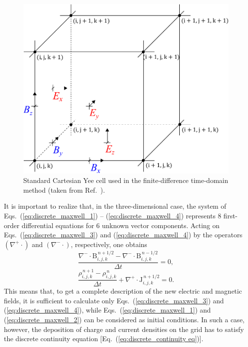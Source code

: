 \documentclass[10pt, a4paper, twoside, openright]{report}
\renewcommand{\vec}[1]{\boldsymbol{\mathrm{#1}}}
\begin{document}
\begin{figure}[t]
	\includegraphics[width=0.35\paperwidth]{./img/yee.pdf}
	\caption[]{\label{fig:yee_lattice} Standard Cartesian Yee cell used in the finite-difference time-domain method (taken from Ref.~).}
\end{figure}

It is important to realize that, in the three-dimensional case, the system of Eqs.~(\ref{eq:discrete_maxwell_1}) -- (\ref{eq:discrete_maxwell_4}) represents 8 first-order differential equations for 6 unknown vector components. Acting on Eqs.~(\ref{eq:discrete_maxwell_3}) and (\ref{eq:discrete_maxwell_4}) by the operators $ \left(\nabla^{+}\cdot\right) $ and $ \left(\nabla^{-}\cdot\right) $, respectively, one obtains
\begin{equation}\label{eq:discrete_eq_for_B}
	\frac{\nabla^{-} \cdot \vec{B}_{i, j, k}^{\,n + 1/2} - \nabla^{-} \cdot \vec{B}_{i, j, k}^{\,n - 1/2}}{\Delta t} = 0,
\end{equation}
\begin{equation}\label{eq:discrete_continuity_eq}
	\frac{\rho_{i, j, k}^{\,n + 1} - \rho_{i, j, k}^{\,n}}{\Delta t} + \nabla^{+} \cdot \vec{J}_{i, j, k}^{\,n + 1/2} = 0.
\end{equation}
This means that, to get a complete description of the new electric and magnetic fields, it is sufficient to calculate only Eqs.~(\ref{eq:discrete_maxwell_3}) and (\ref{eq:discrete_maxwell_4}), while Eqs.~(\ref{eq:discrete_maxwell_1}) and (\ref{eq:discrete_maxwell_2}) can be considered as initial conditions. In such a case, however, the deposition of charge and current densities on the grid has to satisfy the discrete continuity equation [Eq.~(\ref{eq:discrete_continuity eq})].
\end{document}

